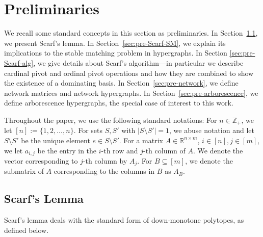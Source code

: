 \documentclass[11pt]{article}
\begin{document}
\section{Preliminaries}\label{sec:prelims}
We recall some standard concepts in this section as preliminaries. In Section~\ref{sec:pre-Scarf}, we present Scarf's lemma. In Section~\ref{sec:pre-Scarf-SM}, we explain its implications to the stable matching problem in hypergraphs. In Section \ref{sec:pre-Scarf-alg}, we give details about Scarf's algorithm---in particular we describe cardinal pivot and ordinal pivot operations and how they are combined to show the existence of a dominating basis. In Section~\ref{sec:pre-network}, we define network matrices and network hypergraphs. In Section~\ref{sec:pre-arborescence}, we define arborescence hypergraphs, the special case of interest to this work. 

Throughout the paper, we use the following standard notations: For $n\in\mathbb{Z}_+$, we let $[n]:=\{1,2,\dots,n\}$. For sets $S,S'$ with $|S\setminus S'|=1$, we abuse notation and let $S\setminus S'$ be the unique element $e\in S\setminus S'$. For a matrix $A\in\mathbb{R}^{n\times m}$, $i\in[n], j\in[m]$, we let $a_{i,j}$ be the entry in the $i$-th row and $j$-th column of $A$. We denote the vector corresponding to $j$-th column by $A_j$. For $B\subseteq[m]$, we denote the submatrix of $A$ corresponding to the columns in $B$ as $A_B$.




































\subsection{Scarf's Lemma}\label{sec:pre-Scarf}
Scarf's lemma deals with the standard form of down-monotone polytopes, as defined below.
\end{document}
